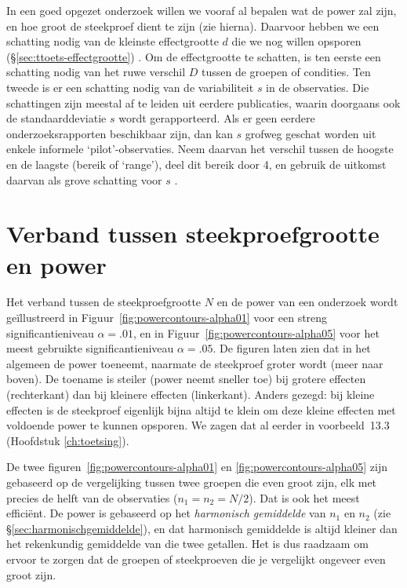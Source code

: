 \documentclass[
]{book}
\begin{document}
In een goed opgezet onderzoek willen we vooraf al bepalen wat de power
zal zijn, en hoe groot de steekproef dient te zijn (zie hierna).
Daarvoor hebben we een schatting nodig van de kleinste effectgrootte \(d\)
die we nog willen opsporen
(§\ref{sec:ttoets-effectgrootte}) \citep{Quene10}. Om de effectgrootte te
schatten, is ten eerste een schatting nodig van het ruwe verschil \(D\)
tussen de groepen of condities. Ten tweede is er een schatting nodig van
de variabiliteit \(s\) in de observaties. Die schattingen zijn meestal af
te leiden uit eerdere publicaties, waarin doorgaans ook de
standaarddeviatie \(s\) wordt gerapporteerd. Als er geen eerdere
onderzoeksrapporten beschikbaar zijn, dan kan \(s\) grofweg geschat worden
uit enkele informele `pilot'-observaties. Neem daarvan het verschil
tussen de hoogste en de laagste (bereik of `range'), deel dit bereik
door 4, en gebruik de uitkomst daarvan als grove schatting voor \(s\)
\citep{PD08}.

\hypertarget{sec:steekproefgrootte-power}{%
\section{Verband tussen steekproefgrootte en power}\label{sec:steekproefgrootte-power}}

Het verband tussen de steekproefgrootte \(N\) en de power van een
onderzoek wordt geïllustreerd in
Figuur~\ref{fig:powercontours-alpha01} voor een streng
significantieniveau \(\alpha=.01\), en in
Figuur~\ref{fig:powercontours-alpha05} voor het meest gebruikte
significantieniveau \(\alpha=.05\). De figuren laten zien dat in het
algemeen de power toeneemt, naarmate de steekproef groter wordt (meer
naar boven). De toename is steiler (power neemt sneller toe) bij grotere
effecten (rechterkant) dan bij kleinere effecten (linkerkant). Anders gezegd: bij
kleine effecten is de steekproef eigenlijk bijna altijd te klein om deze
kleine effecten met voldoende power te kunnen opsporen. We zagen dat al
eerder in voorbeeld~13.3 (Hoofdstuk \ref{ch:toetsing}).

De twee figuren~\ref{fig:powercontours-alpha01} en
\ref{fig:powercontours-alpha05} zijn gebaseerd op de vergelijking tussen twee groepen die even groot zijn, elk met precies de helft van de observaties (\(n_1=n_2=N/2\)). Dat is ook het meest efficiënt.
De power is gebaseerd op het \emph{harmonisch gemiddelde} van \(n_1\) en \(n_2\) (zie §\ref{sec:harmonischgemiddelde}), en dat harmonisch gemiddelde is altijd kleiner dan het rekenkundig gemiddelde van die twee getallen. Het is dus raadzaam om ervoor te zorgen dat de groepen of steekproeven die je vergelijkt ongeveer even groot zijn.
\end{document}
